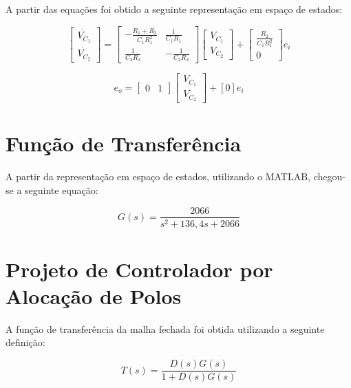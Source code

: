\documentclass[
oneside,					%
a4paper,					%
english,					%
brazil,					%
]{abntex2}
\begin{document}
A partir das equações foi obtido a seguinte representação em espaço de estados:

\begin{equation}
	\left[
	\begin{matrix}
	\dot{V_{C_1}}\\\dot{V_{C_2}}
	\end{matrix}
	\right]
	= 
	\left[
	\begin{matrix}
		-\frac{R_1+R_2}{C_1 R_1^2} & \frac{1}{C_1 R_1}\\
		\frac{1}{C_2 R_2} & -\frac{1}{C_2 R_2}
	\end{matrix}
	\right]
	\left[
	\begin{matrix}
	V_{C_1}\\V_{C_2}
	\end{matrix}
	\right]
	+ \left[
	\begin{matrix}
	\frac{R_2}{C_1 R_1^2}\\
	0
	\end{matrix}
	\right] e_i
\end{equation}	
	
\begin{equation}	
	e_o = \left[
	\begin{matrix}
		0 & 1
	\end{matrix}
	\right]
	\left[
	\begin{matrix}
		V_{C_1}\\V_{C_2}
	\end{matrix}
	\right]
	+
	\left[ 0 \right]e_i
\end{equation}

\section{Função de Transferência}

A partir da representação em espaço de estados, utilizando o MATLAB, chegou-se a seguinte equação:

\begin{equation}
	G(s) = \frac{2066}{s^2 + 136,4s + 2066}
\end{equation}

\section{Projeto de Controlador por Alocação de Polos}

A função de transferência da malha fechada foi obtida utilizando a seguinte definição:

\begin{equation}	
T(s) = \frac{D(s)G(s)}{1 + D(s)G(s)}
\end{equation}
\end{document}
